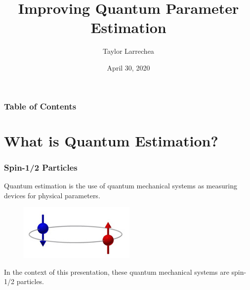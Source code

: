 \documentclass{beamer}
\title{Improving Quantum Parameter Estimation} %
\author{Taylor Larrechea} %
\institute[CMU] %
{
Colorado Mesa University \\ %
\medskip
}
\date{April 30, 2020} %
\begin{document}
\begin{frame}
\titlepage %
\end{frame}
\begin{frame}
\frametitle{Table of Contents}
\begin{multicols}{2}
\tableofcontents
\end{multicols}
\end{frame}
\section{What is Quantum Estimation?}
\begin{frame}
\frametitle{Spin-1/2 Particles}
Quantum estimation is the use of quantum mechanical systems as measuring devices for physical parameters.
\begin{figure}
\begin{center}
\includegraphics[width=0.75\linewidth]{Spin-12-Cartoon.jpg}
\end{center}
\end{figure}
In the context of this presentation, these quantum mechanical systems are spin-1/2 particles.
\end{frame}
\end{document}
